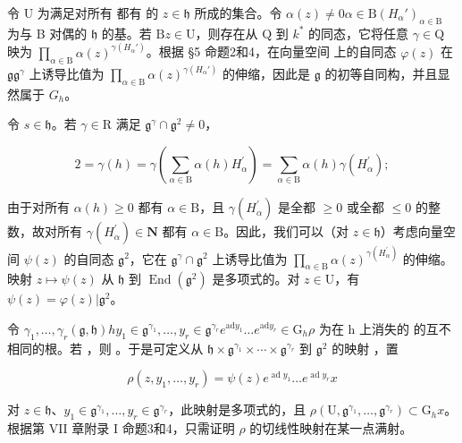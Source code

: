 令 \(\mathrm{U}\) 为满足对所有  都有  的 \(z \in \mathfrak{h}\) 所成的集合。令 \(\alpha(z) \neq 0\)\(\alpha \in \mathrm{B}\)\((H_{\alpha}')_{\alpha \in \mathrm{B}}\) 为与 B 对偶的 \(\mathfrak{h}\) 的基。若 \(\mathrm{B}\)\(z \in \mathrm{U}\)，则存在从 \(\mathrm{Q}\) 到 \(k^*\) 的同态，它将任意 \(\gamma \in \mathrm{Q}\) 映为 \(\prod_{\alpha \in \mathrm{B}} \alpha(z)^{\gamma(H_{\alpha}')}\)。根据 §5 命题2和4，在向量空间  上的自同态 \(\varphi(z)\) 在 \(\mathfrak{g}\)\(\mathfrak{g}^{\gamma}\) 上诱导比值为 \(\prod_{\alpha \in \mathrm{B}} \alpha(z)^{\gamma(H_{\alpha}')}\) 的伸缩，因此是 \(\mathfrak{g}\) 的初等自同构，并且显然属于 \(G_h\)。

令 \(s \in \mathfrak{h}\)。若 \(\gamma \in \mathrm{R}\) 满足 \(\mathfrak{g}^{\gamma} \cap \mathfrak{g}^{2} \neq 0\)，

\[
2 = \gamma (h) = \gamma \left(\sum_ {\alpha \in \mathrm{B}} \alpha (h) H _ {\alpha} ^ {\prime}\right) = \sum_ {\alpha \in \mathrm{B}} \alpha (h) \gamma (H _ {\alpha} ^ {\prime});
\]

由于对所有 \(\alpha(h) \geq 0\) 都有 \(\alpha \in \mathrm{B}\)，且 \(\gamma(H_{\alpha}^{\prime})\) 是全都 \(\geq 0\) 或全都 \(\leq 0\) 的整数，故对所有 \(\gamma(H_{\alpha}^{\prime}) \in \mathbf{N}\) 都有 \(\alpha \in \mathrm{B}\)。因此，我们可以（对 \(z \in \mathfrak{h}\)）考虑向量空间 \(\psi(z)\) 的自同态 \(\mathfrak{g}^2\)，它在 \(\mathfrak{g}^{\gamma} \cap \mathfrak{g}^2\) 上诱导比值为 \(\prod_{\alpha \in \mathrm{B}} \alpha(z)^{\gamma(H_{\alpha}^{\prime})}\) 的伸缩。映射 \(z \mapsto \psi(z)\) 从 \(\mathfrak{h}\) 到 \(\operatorname{End}(\mathfrak{g}^2)\) 是多项式的。对 \(z \in \mathrm{U}\)，有 \(\psi(z) = \varphi(z)|\mathfrak{g}^2\)。

令 \(\gamma_1, \ldots, \gamma_r\)\((\mathfrak{g}, \mathfrak{h})\)\(h\)\(y_1 \in \mathfrak{g}^{\gamma_1}, \ldots, y_r \in \mathfrak{g}^{\gamma_r}\)\(e^{\mathrm{ad} y_1} \ldots e^{\mathrm{ad} y_r} \in \mathrm{G}_h\)\(\rho\) 为在 h 上消失的  的互不相同的根。若 ，则 。于是可定义从 \(\mathfrak{h} \times \mathfrak{g}^{\gamma_1} \times \cdots \times \mathfrak{g}^{\gamma_r}\) 到 \(\mathfrak{g}^2\) 的映射 ，置

\[
\rho (z, y _ {1}, \dots , y _ {r}) = \psi (z) e ^ {\operatorname{ad} y _ {1}} \dots e ^ {\operatorname{ad} y _ {r}} x
\]

对 \(z \in \mathfrak{h}\)、\(y_1 \in \mathfrak{g}^{\gamma_1}, \ldots, y_r \in \mathfrak{g}^{\gamma_r}\)，此映射是多项式的，且 \(\rho(\mathrm{U}, \mathfrak{g}^{\gamma_1}, \ldots, \mathfrak{g}^{\gamma_r}) \subset \mathrm{G}_h x\)。根据第 VII 章附录 I 命题3和4，只需证明 \(\rho\) 的切线性映射在某一点满射。

